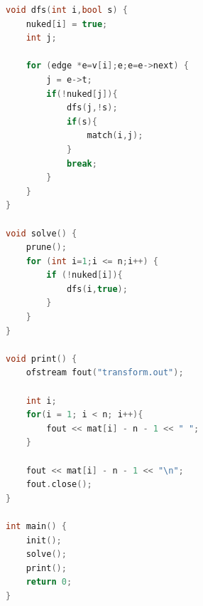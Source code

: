 \documentclass[12pt,twiside,a4paper]{ctexbook}
\numberwithin{chapter}{part}
\begin{document}
\begin{lstlisting}[language=c++,breaklines=true]
void dfs(int i,bool s) { 
	nuked[i] = true; 
	int j; 

	for (edge *e=v[i];e;e=e->next) { 
		j = e->t; 
		if(!nuked[j]){ 
			dfs(j,!s); 
			if(s){
				match(i,j); 
			}
			break; 
		} 
	} 
}

void solve() { 
	prune(); 
	for (int i=1;i <= n;i++) { 
		if (!nuked[i]){
			dfs(i,true); 
		} 
	}
}

void print() {
    ofstream fout("transform.out");

    int i;
    for(i = 1; i < n; i++){
	    fout << mat[i] - n - 1 << " ";
    }

    fout << mat[i] - n - 1 << "\n";
    fout.close();
}

int main() {
    init();
    solve();
    print();
    return 0;
}
\end{lstlisting}
\end{document}
